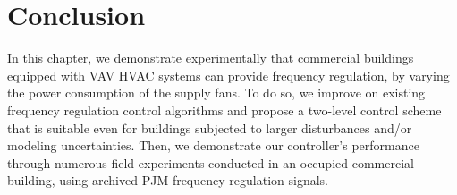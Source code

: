 \section{Conclusion}\label{sec:conclusions}
In this chapter, we demonstrate experimentally that commercial buildings equipped with VAV HVAC systems can provide frequency regulation, by varying the power consumption of the supply fans.
To do so, we improve on existing frequency regulation control algorithms and propose a two-level control scheme that is suitable even for buildings subjected to larger disturbances and/or modeling uncertainties.
Then, we demonstrate our controller's performance through numerous field experiments conducted in an occupied commercial building, using archived PJM frequency regulation signals.


